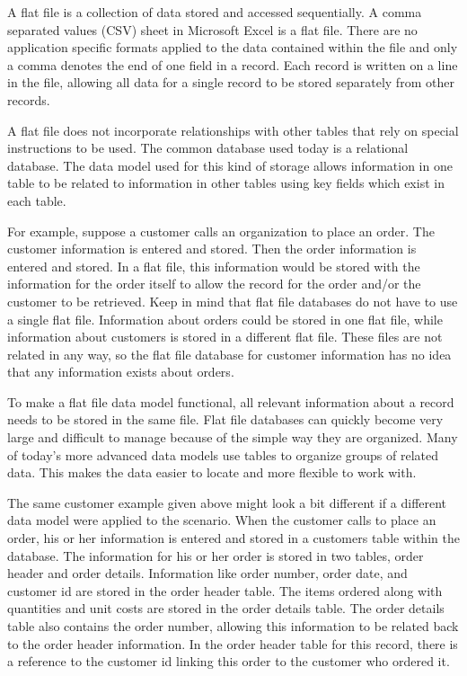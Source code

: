 A flat file is a collection of data stored and accessed sequentially. A comma separated values (CSV) sheet in Microsoft Excel is a flat file. There are no application specific formats applied to the data contained within the file and only a comma denotes the end of one field in a record. Each record is written on a line in the file, allowing all data for a single record to be stored separately from other records.


A flat file does not incorporate relationships with other tables that rely on special instructions to be used. The common database used today is a relational database. The data model used for this kind of storage allows information in one table to be related to information in other tables using key fields which exist in each table.


For example, suppose a customer calls an organization to place an order. The customer information is entered and stored. Then the order information is entered and stored. In a flat file, this information would be stored with the information for the order itself to allow the record for the order and/or the customer to be retrieved. Keep in mind that flat file databases do not have to use a single flat file. Information about orders could be stored in one flat file, while information about customers is stored in a different flat file. These files are not related in any way, so the flat file database for customer information has no idea that any information exists about orders.


To make a flat file data model functional, all relevant information about a record needs to be stored in the same file. Flat file databases can quickly become very large and difficult to manage because of the simple way they are organized. Many of today’s more advanced data models use tables to organize groups of related data. This makes the data easier to locate and more flexible to work with.


The same customer example given above might look a bit different if a different data model were applied to the scenario. When the customer calls to place an order, his or her information is entered and stored in a customers table within the database. The information for his or her order is stored in two tables, order header and order details. Information like order number, order date, and customer id are stored in the order header table. The items ordered along with quantities and unit costs are stored in the order details table. The order details table also contains the order number, allowing this information to be related back to the order header information. In the order header table for this record, there is a reference to the customer id linking this order to the customer who ordered it.




